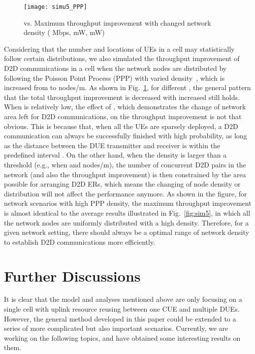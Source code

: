 \documentclass[journal, 10pt]{IEEEtran}
\begin{document}
\begin{figure}[!htb]
\centering \texttt{[image: simu5\_PPP]} \caption{ vs. Maximum throughput improvement with changed 
network density  ( Mbps,  mW, 
 mW)}\label{fig:sim-ppp}
\end{figure}

Considering that the number and locations of UEs in a cell may
statistically follow certain distributions, we also simulated the
throughput improvement of D2D communications in a cell when the
network nodes are distributed by following the Poisson Point Process
(PPP) with varied density~, which is increased from  to  nodes/m. As shown in
Fig.~\ref{fig:sim-ppp}, for different , the general pattern
that the total throughput improvement is decreased with increased
 still holds. When  is relatively low, the
effect of , which demonstrates the change of network
area left for D2D communications, on the throughput improvement is not
that obvious. This is because that, when all the UEs are sparsely
deployed, a D2D communication can always be successfully finished with
high probability, as long as the distance between the DUE transmitter
and receiver is within the predefined interval .
On the other hand, when the density  is larger than a
threshold (e.g., when  and  nodes/m), the number of concurrent D2D pairs in the
network (and also the throughput improvement) is then constrained by
the area possible for arranging D2D ERs, which means the changing of
node density or distribution will not affect the performance anymore.
As shown in the figure, for network scenarios with high PPP density,
the maximum throughput improvement is almost identical to the average
results illustrated in Fig.~\ref{fig:sim5}, in which all the network
nodes are uniformly distributed with a high density. Therefore, for a
given network setting, there should always be a optimal range of
network density to establish D2D communications more efficiently.



\section{Further Discussions}\label{sec:dis}

It is clear that the model and analyses mentioned above are only
focusing on a single cell with uplink resource reusing between one CUE
and multiple DUEs. However, the general method developed in this paper
could be extended to a series of more complicated but also important
scenarios. Currently, we are working on the following topics, and have
obtained some interesting results on them. 
 
\end{document}
